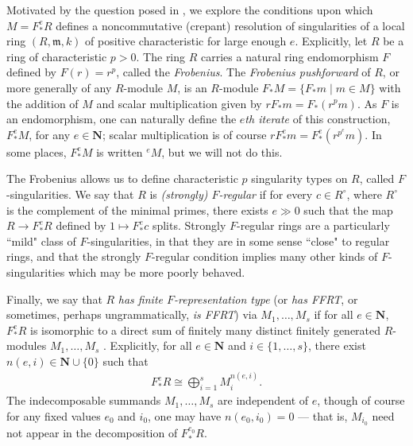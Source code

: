 \documentclass{amsart}
\theoremstyle{definition}
\def\fm{\mathfrak{m}}
\newcommand{\NN}{\mathbf N}
\newcommand{\Fe}{F_{*}^{e}}
\begin{document}
\bigbreak

Motivated by the question posed in \cite{FMS19}, we explore the conditions upon which $M=\Fe R$ defines a noncommutative (crepant) resolution of singularities of a local ring $(R,\fm,k)$ of positive characteristic for large enough $e$. Explicitly, let $R$ be a ring of characteristic $p>0$. The ring $R$ carries a natural ring endomorphism $F$ defined by $F(r)=r^{p}$, called the \emph{Frobenius}. The \emph{Frobenius pushforward} of $R$, or more generally of any $R$-module $M$, is an $R$-module $F_{*}M=\{F_{*}m\mid m\in M\}$ with the addition of $M$ and scalar multiplication given by $rF_{*}m=F_{*}(r^{p}m)$. As $F$ is an endomorphism, one can naturally define the \emph{$e$th iterate} of this construction, $\Fe M$, for any $e\in\NN$; scalar multiplication is of course $r\Fe m=\Fe(r^{p^{e}}m)$. In some places, $\Fe M$ is written $^{e}M$, but we will not do this. 

\bigbreak

The Frobenius allows us to define characteristic $p$ singularity types on $R$, called $F$-singularities. We say that $R$ is \emph{(strongly) $F$-regular} if for every $c\in R^{\circ}$, where $R^{\circ}$ is the complement of the minimal primes, there exists $e\gg0$ such that the map $R\to\Fe R$ defined by $1\mapsto\Fe c$ splits. Strongly $F$-regular rings are a particularly ``mild" class of $F$-singularities, in that they are in some sense ``close" to regular rings, and that the strongly $F$-regular condition implies many other kinds of $F$-singularities which may be more poorly behaved.

\bigbreak

Finally, we say that $R$ \emph{has finite $F$-representation type} (or \emph{has FFRT}, or sometimes, perhaps ungrammatically, \emph{is FFRT}) via $M_{1},\ldots,M_{s}$ if for all $e\in\NN$, $\Fe R$ is isomorphic to a direct sum of finitely many distinct finitely generated $R$-modules $M_{1},\ldots,M_{s}$ \cite[Dfn.\ 3.1.1]{SVdB97}. Explicitly, for all $e\in\NN$ and $i\in\{1,\ldots,s\}$, there exist $n(e,i)\in\NN\cup\{0\}$ such that
\begin{align*}
\Fe R\cong\bigoplus_{i=1}^{s}M_{i}^{n(e,i)}.
\end{align*} 
The indecomposable summands $M_{1},\ldots,M_{s}$ are independent of $e$, though of course for any fixed values $e_{0}$ and $i_{0}$, one may have $n(e_{0},i_{0})=0$ --- that is, $M_{i_{0}}$ need not appear in the decomposition of $F_{*}^{e_{0}}R$. 

\bigbreak 
\end{document}
